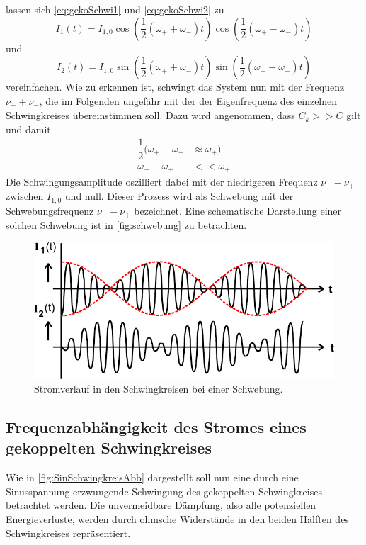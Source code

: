 lassen sich \eqref{eq:gekoSchwi1} und \eqref{eq:gekoSchwi2} zu
\begin{equation*}
    I_1(t) = I_{1,0}\cos(\dfrac{1}{2}(ω_+ + ω_-)t) \cos(\dfrac{1}{2}(ω_+ - ω_-)t) 
\end{equation*}
und
\begin{equation*}
    I_2(t) = I_{1,0}\sin(\dfrac{1}{2}(ω_+ + ω_-)t) \sin(\dfrac{1}{2}(ω_+ - ω_-)t)
\end{equation*}
vereinfachen. Wie zu erkennen ist, schwingt das System nun mit der Frequenz $ν_+ + ν_-$, die im Folgenden ungefähr mit der der Eigenfrequenz des einzelnen Schwingkreises übereinstimmen soll.
Dazu wird angenommen, dass $C_k >> C$ gilt und damit
\begin{align*}
    \dfrac{1}{2}(ω_+ + ω_- & \approx ω_+) \\
    ω_- - ω_+ & << ω_+
\end{align*}
Die Schwingungsamplitude oszilliert dabei mit der niedrigeren Frequenz $ν_- - ν_+$ zwischen $I_{1,0}$ und null. Dieser Prozess wird als Schwebung mit der Schwebungsfrequenz $ν_- - ν_+$ bezeichnet.
Eine schematische Darstellung einer solchen Schwebung ist in \autoref{fig:schwebung} zu betrachten.

\begin{figure}[H]
    \centering
    \includegraphics{SchwebungAbb.pdf}
    \caption{Stromverlauf in den Schwingkreisen bei einer Schwebung\cite{ap04}.}
    \label{fig:schwebung}
\end{figure}

\subsection{Frequenzabhängigkeit des Stromes eines gekoppelten Schwingkreises}

Wie in \autoref{fig:SinSchwingkreisAbb} dargestellt soll nun eine durch eine Sinusspannung erzwungende Schwingung des gekoppelten Schwingkreises betrachtet werden.
Die unvermeidbare Dämpfung, also alle potenziellen Energieverluste, werden durch ohmsche Widerstände in den beiden Hälften des Schwingkreises repräsentiert.

